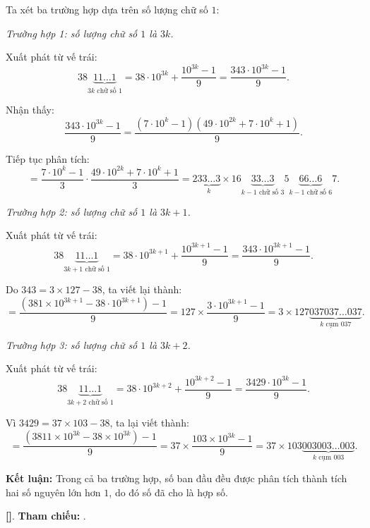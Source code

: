 \documentclass[../2015-n-s.tex]{subfiles}
\begin{document}
\begin{soln}

	Ta xét ba trường hợp dựa trên số lượng chữ số \(1\):

	\textit{Trường hợp 1: số lượng chữ số \(1\) là \(3k\).}

	Xuất phát từ vế trái:
	\[
		38\underbrace{11\dots1}_{3k\text{ chữ số }1}
		= 38\cdot10^{3k} + \frac{10^{3k}-1}{9}
		= \frac{343\cdot10^{3k}-1}{9}.
	\]

	Nhận thấy:
	\[
		\frac{343\cdot10^{3k}-1}{9} 
		= \frac{(7\cdot10^k-1)(49\cdot10^{2k}+7\cdot10^k+1)}{9}.
	\]

	Tiếp tục phân tích:
	\[
		= \frac{7\cdot10^k-1}{3}\cdot\frac{49\cdot10^{2k}+7\cdot10^k+1}{3}
		= 2\underbrace{33\dots3}_{k}\times16\underbrace{33\dots3}_{k-1\text{ chữ số }3}5\underbrace{66\dots6}_{k-1\text{ chữ số }6}7.
	\]

	\textit{Trường hợp 2: số lượng chữ số \(1\) là \(3k+1\).}

	Xuất phát từ vế trái:
	\[
		38\underbrace{11\dots1}_{3k+1\text{ chữ số }1}
		= 38\cdot10^{3k+1} + \frac{10^{3k+1}-1}{9}
		= \frac{343\cdot10^{3k+1}-1}{9}.
	\]

	Do \(343=3\times127-38\), ta viết lại thành:
	\[
		= \frac{(381\times10^{3k+1}-38\cdot10^{3k+1})-1}{9}
		= 127\times\frac{3\cdot10^{3k+1}-1}{9}
		= 3\times127\underbrace{037037\dots037}_{k\text{ cụm }037}.
	\]

	\textit{Trường hợp 3: số lượng chữ số \(1\) là \(3k+2\).}

	Xuất phát từ vế trái:
	\[
		38\underbrace{11\dots1}_{3k+2\text{ chữ số }1}
		= 38\cdot10^{3k+2} + \frac{10^{3k+2}-1}{9}
		= \frac{3429\cdot10^{3k}-1}{9}.
	\]

	Vì \(3429=37\times103-38\), ta lại viết thành:
	\[
		= \frac{(3811\times10^{3k}-38\times10^{3k})-1}{9}
		= 37\times\frac{103\times10^{3k}-1}{9}
		= 37\times103\underbrace{003003\dots003}_{k\text{ cụm }003}.
	\]

	\textbf{Kết luận:} Trong cả ba trường hợp, số ban đầu đều được phân tích thành tích hai số nguyên lớn hơn \(1\), do đó số đã cho là hợp số.
	
	\vspace{1em}
	\textbf{[]}.
	\textbf{Tham chiếu:}  .
\end{soln}

\end{document}
